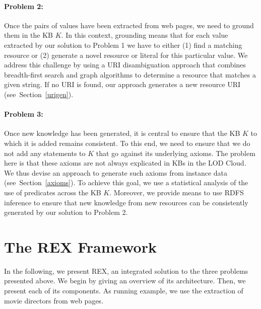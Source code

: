 \paragraph{Problem 2:}
Once the  pairs of values have been extracted from web pages, we need to ground them in the  \ac{KB} $K$. 
In this context, grounding means that for each value extracted by our solution to Problem 1 we have to either (1) find a matching resource or (2) generate a novel resource or literal for this particular value. 
We address this challenge by using a URI disambiguation approach that combines breadth-first search and graph algorithms to determine a resource that matches a given string. 
If no URI is found, our approach generates a new resource URI (see~Section~\ref{urigen}). 

\paragraph{Problem 3:}
Once new knowledge has been generated, it is central to ensure that the  \ac{KB} $K$ to which it is added remains consistent. 
To this end, we need to ensure that we do not add any statements to $K$ that go against its underlying axioms. 
The problem here is that these axioms are not always explicated in  \ac{KB}s in the \ac{LOD} Cloud. 
We thus devise an approach to generate such axioms from instance data (see~Section~\ref{axioms}). 
To achieve this goal, we use a statistical analysis of the use of predicates across the  \ac{KB} $K$. 
Moreover, we provide means to use RDFS inference to ensure that new knowledge from new resources can be consistently generated by our solution to Problem 2.


\section{The REX Framework}
\label{sec:rex}
In the following, we present REX, an integrated  solution to the three problems presented above.
We begin by giving an overview of its architecture.
Then, we present each of its components.
As running example, we use the extraction of movie directors from web pages.

